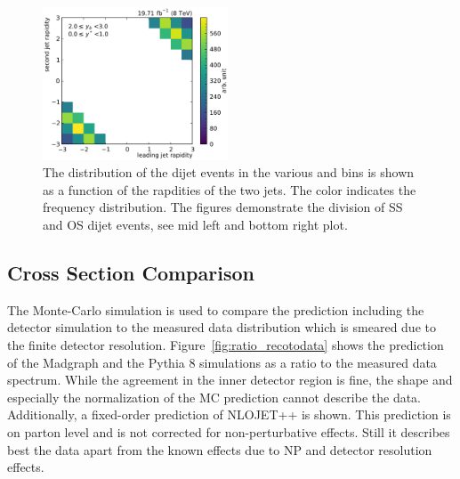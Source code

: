 \begin{figure}[htbp]
    \includegraphics[width=0.49\textwidth]{figures/measurement/jet12_rapidity_yb2ys0.pdf}
    \caption[Rapidities of the two leading jets in the various \ystar and \yboost bins]{
             The distribution of the dijet events in the various \ystar and
             \yboost bins is shown as a function of the rapdities of the two jets.
             The color indicates the frequency distribution. The figures demonstrate the
             division of SS and OS dijet events, see \eg mid left and bottom right plot.}
    \label{fig:controlplots:rapidity}
\end{figure}

\subsection{Cross Section Comparison}

The Monte-Carlo simulation is used to compare the prediction including the
detector simulation to the measured data distribution which is smeared due to
the finite detector resolution. Figure~\ref{fig:ratio_recotodata} shows the
prediction of the Madgraph and the Pythia 8 simulations as a ratio to the
measured data spectrum.  While the agreement in the inner detector region is
fine, the shape and especially the normalization of the MC prediction cannot
describe the data. Additionally, a fixed-order prediction of NLOJET++ is shown.
This prediction is on parton level and is not corrected for non-perturbative
effects. Still it describes best the data apart from the known effects due to NP
and detector resolution effects.

